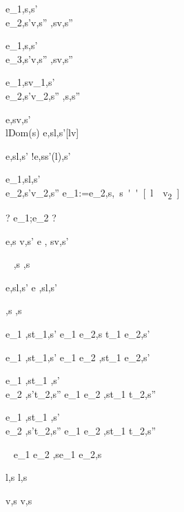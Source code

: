     {e_1,s\evaluate \True,s'\\
     e_2,s'\evaluate v,s''}
    {,s\evaluate v,s''}

  {e_1,s\evaluate \False,s'\\
   e_3,s'\evaluate v,s''}
  {,s\evaluate v,s''}

  {e_1,s\evaluate v_1,s'\\
   e_2,s'\evaluate v_2,s''}
  {,s\evaluate{},s''}

  {e,s\evaluate v,s'\\
   l\not\in Dom(s)}
  {\Ref e,s\evaluate l,s'[l\mapsto v]}

  {e,s\evaluate l,s'}
  {!e,s\evaluate s'(l),s'}

  {e_1,s\evaluate l,s'\\
   e_2,s'\evaluate v_2,s''}
  {e_1:=e_2,s\evaluate \unit,s''[l\mapsto v_2]}

  {?}
  {e_1;e_2 \evaluate ?}

  {e,s \evaluate v,s'}
  {\Edit e , s\evaluate \Edit v,s'}

  {\ }
  {\Enter \tau,s \evaluate \Enter \tau,s}

  {e,s\evaluate l,s'}
  {\Update e ,s\evaluate \Update l,s'}


  { }
  {\Fail,s \evaluate \Fail,s}


  {e_1 ,s\evaluate t_1,s'}
  {e_1 \Then e_2,s \evaluate t_1 \Then e_2,s'}

  {e_1 ,s\evaluate t_1,s'}
  {e_1 \Next e_2 ,s\evaluate t_1 \Next e_2,s'}


  {e_1 ,s\evaluate t_1 ,s'\\
   e_2 ,s'\evaluate t_2,s''}
  {e_1 \And e_2 ,s\evaluate t_1 \And t_2,s''}


  {e_1 ,s\evaluate t_1 ,s'\\
   e_2 ,s'\evaluate t_2,s''}
  {e_1 \Or e_2 ,s\evaluate t_1 \Or t_2,s''}

  {\ }
  {e_1 \Xor e_2 ,s\evaluate e_1 \Xor e_2,s}

  { }
  {\Update l,s \evaluate \Update l,s}

  { }
  {\Edit v,s \evaluate \Edit v,s}

